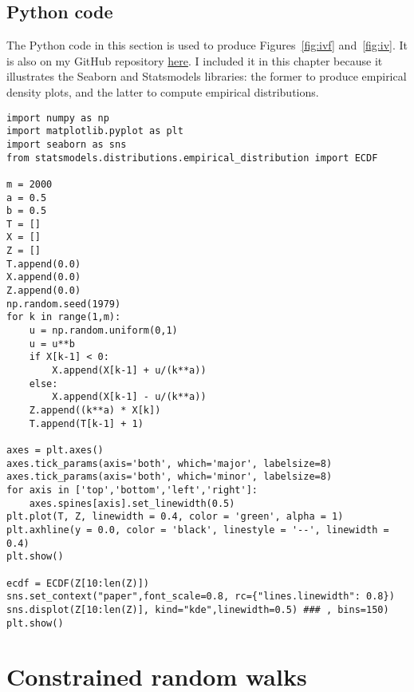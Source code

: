 \documentclass[oneside,10pt]{book}
\begin{document}
\subsection{Python code}\label{dupuis}

The Python code in this section is used to produce Figures~\ref{fig:ivf} and~\ref{fig:iv}. It is also on my GitHub repository 
 \href{https://github.com/VincentGranville/Stochastic-Processes/blob/master/brownian_reflective.py}{here}. I included it in this chapter because it illustrates the Seaborn and Statsmodels libraries: the former to produce empirical density plots, and the latter to compute empirical
 distributions. \vspace{1ex}

\begin{lstlisting}
import numpy as np
import matplotlib.pyplot as plt
import seaborn as sns
from statsmodels.distributions.empirical_distribution import ECDF

m = 2000 
a = 0.5
b = 0.5
T = []
X = []
Z = []
T.append(0.0)
X.append(0.0)
Z.append(0.0)
np.random.seed(1979)
for k in range(1,m):
    u = np.random.uniform(0,1)
    u = u**b
    if X[k-1] < 0:
        X.append(X[k-1] + u/(k**a))
    else:
        X.append(X[k-1] - u/(k**a))
    Z.append((k**a) * X[k])
    T.append(T[k-1] + 1)
   
axes = plt.axes()
axes.tick_params(axis='both', which='major', labelsize=8)
axes.tick_params(axis='both', which='minor', labelsize=8)
for axis in ['top','bottom','left','right']:
    axes.spines[axis].set_linewidth(0.5) 
plt.plot(T, Z, linewidth = 0.4, color = 'green', alpha = 1)  
plt.axhline(y = 0.0, color = 'black', linestyle = '--', linewidth = 0.4)
plt.show()

ecdf = ECDF(Z[10:len(Z)])
sns.set_context("paper",font_scale=0.8, rc={"lines.linewidth": 0.8})
sns.displot(Z[10:len(Z)], kind="kde",linewidth=0.5) ### , bins=150)
plt.show()
\end{lstlisting}


\section{Constrained random walks}




\end{document}
